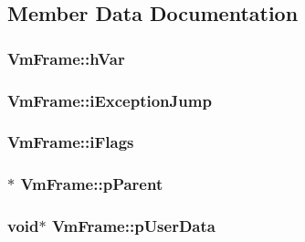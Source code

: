 \subsection{Member Data Documentation}
\hypertarget{struct_vm_frame_a45099db1b6879b47cafd9189eb02ae52}{
\subsubsection[{h\-Var}]{ Vm\-Frame\-::h\-Var}}\label{de/d1c/struct_vm_frame_a45099db1b6879b47cafd9189eb02ae52}
\hypertarget{struct_vm_frame_a012af046cac5e790a5bbc3fbe36d6e93}{
\subsubsection[{i\-Exception\-Jump}]{ Vm\-Frame\-::i\-Exception\-Jump}}\label{de/d1c/struct_vm_frame_a012af046cac5e790a5bbc3fbe36d6e93}
\hypertarget{struct_vm_frame_a62a7fce2ffba62728e7db28e5e7cb71b}{
\subsubsection[{i\-Flags}]{ Vm\-Frame\-::i\-Flags}}\label{de/d1c/struct_vm_frame_a62a7fce2ffba62728e7db28e5e7cb71b}
\hypertarget{struct_vm_frame_a52ffb5d88b9705f5ba5e74b85d58592b}{
\subsubsection[{p\-Parent}]{$\ast$ Vm\-Frame\-::p\-Parent}}\label{de/d1c/struct_vm_frame_a52ffb5d88b9705f5ba5e74b85d58592b}
\hypertarget{struct_vm_frame_a92040623bc5d65c89d09a60944f2d8e9}{
\subsubsection[{p\-User\-Data}]{\setlength{\rightskip}{0pt plus 5cm}void$\ast$ Vm\-Frame\-::p\-User\-Data}}\label{de/d1c/struct_vm_frame_a92040623bc5d65c89d09a60944f2d8e9}
